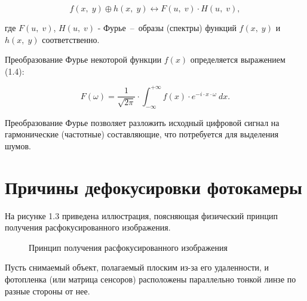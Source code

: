 \begin{equation}
	f(x,\;y) \oplus h(x,\;y) \longleftrightarrow F(u,\;v) \cdot H(u,\;v),
\end{equation}

где $F(u,\;v)$, $H(u,\;v)$ - Фурье~--~образы (спектры) функций $f(x,\;y)$ и $h(x,\;y)$ соответственно.

Преобразование Фурье некоторой функции $f(x)$ определяется выражением (1.4):

\begin{equation}
	F(\omega) = \frac{1}{\sqrt{2\pi}} \cdot \int_{-\infty}^{+\infty}f(x) \cdot e^{-i\cdot x \cdot \omega}~dx.
\end{equation}

Преобразование Фурье позволяет разложить исходный цифровой сигнал на гармонические (частотные) составляющие, что потребуется для выделения шумов.

\clearpage

\section{Причины дефокусировки фотокамеры}

На рисунке 1.3 приведена иллюстрация, поясняющая физический принцип получения расфокусированного изображения.~\cite{graphic}

\begin{figure}[!h]
	\caption{Принцип получения расфокусированного изображения}
\end{figure}

Пусть снимаемый объект, полагаемый плоским из-за его удаленности, и фотопленка (или матрица сенсоров) расположены параллельно тонкой линзе по разные стороны от нее. 

